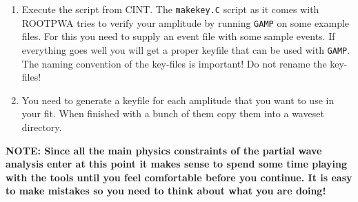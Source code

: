 \documentclass[12pt,a4paper]{article}
\begin{document}
{\begin{enumerate}
\begin{lstlisting}
  // Define Isobar states and their decays
  // each of these objects corresponds to one node
  // in an isobar decay tree

  //              name   iso1 iso2 l
  partkey sigma1("sigma",&p1,&p2,0);
  partkey rho1("rho(770)",&p3,&p4,1);
  partkey pi13("pi(1300)",&p5,&rho1,1);

  // define quantum numbers of resonance X
  // and its decay into the first isobar pair
  int l=2;  // angular momentum
  int s=0;  // spin

  int j=2;  // total spin of X
  int m=0;  // spin projection
  int eps=1; // reflectivity
  int p=-1; // parity

  // the isobar decay of X
  partkey X("X",&sigma1,&pi13,l,s);

  // final partial wave with all quantum numbers
  wavekey mykey(j,p,m,eps,&X);

  // write the key-file:
  mykey.write();
\end{lstlisting}

\item Execute the script from CINT. The {\tt makekey.C} script as it comes with ROOTPWA tries to verify your amplitude by running {\tt GAMP} on some example files. For this you need to supply an event file with some sample events. If everything goes well you will get a proper keyfile that can be used with {\tt GAMP}. The naming convention of the key-files is important! Do not rename the key-files!
\item You need to generate a keyfile for each amplitude that you want to use in your fit. When finished with a bunch of them copy them into a waveset directory. \end{enumerate}

{\bfseries NOTE: Since all the main physics constraints of the partial wave analysis enter at this point it makes sense to spend some time playing with the tools until you feel comfortable before you continue. It is easy to make mistakes so you need to think about what you are doing!}


}
\end{document}
